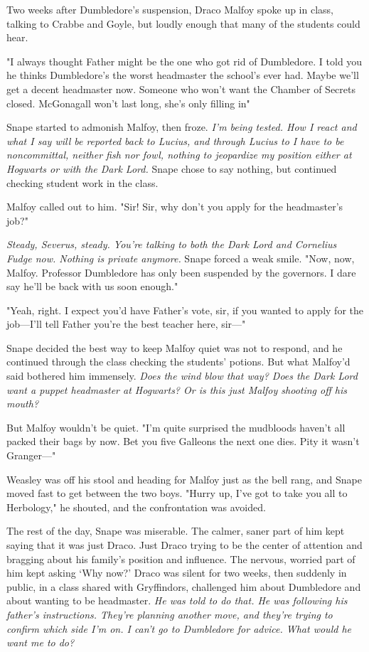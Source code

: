 Two weeks after Dumbledore's suspension, Draco Malfoy spoke up in class, talking to Crabbe and Goyle, but loudly enough that many of the students could hear.

"I always thought Father might be the one who got rid of Dumbledore. I told you he thinks Dumbledore's the worst headmaster the school's ever had. Maybe we'll get a decent headmaster now. Someone who won't want the Chamber of Secrets closed. McGonagall won't last long, she's only filling in{\el}"

Snape started to admonish Malfoy, then froze. \emph{I'm being tested. How I react and what I say will be reported back to Lucius, and through Lucius to{\el} I have to be noncommittal, neither fish nor fowl, nothing to jeopardize my position either at Hogwarts or with the Dark Lord.} Snape chose to say nothing, but continued checking student work in the class.

Malfoy called out to him. "Sir! Sir, why don't you apply for the headmaster's job?"

\emph{Steady, Severus, steady. You're talking to both the Dark Lord and Cornelius Fudge now. Nothing is private anymore.} Snape forced a weak smile. "Now, now, Malfoy. Professor Dumbledore has only been suspended by the governors. I dare say he'll be back with us soon enough."

"Yeah, right. I expect you'd have Father's vote, sir, if you wanted to apply for the job—I'll tell Father you're the best teacher here, sir—"

Snape decided the best way to keep Malfoy quiet was not to respond, and he continued through the class checking the students' potions. But what Malfoy'd said bothered him immensely. \emph{Does the wind blow that way? Does the Dark Lord want a puppet headmaster at Hogwarts? Or is this just Malfoy shooting off his mouth?}

But Malfoy wouldn't be quiet. "I'm quite surprised the mudbloods haven't all packed their bags by now. Bet you five Galleons the next one dies. Pity it wasn't Granger—"

Weasley was off his stool and heading for Malfoy just as the bell rang, and Snape moved fast to get between the two boys. "Hurry up, I've got to take you all to Herbology," he shouted, and the confrontation was avoided.

The rest of the day, Snape was miserable. The calmer, saner part of him kept saying that it was just Draco. Just Draco trying to be the center of attention and bragging about his family's position and influence. The nervous, worried part of him kept asking `Why now?' Draco was silent for two weeks, then suddenly in public, in a class shared with Gryffindors, challenged him about Dumbledore and about wanting to be headmaster. \emph{He was told to do that. He was following his father's instructions. They're planning another move, and they're trying to confirm which side I'm on. I can't go to Dumbledore for advice. What would he want me to do?}

